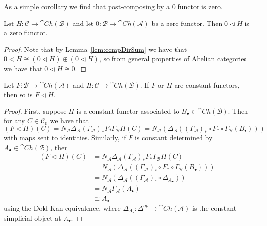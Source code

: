 As a simple corollary we find that post-composing by a $0$ functor is zero.

\begin{cor}[label=cor:contractLHD]
    Let $H:\mathcal{C}\to \cat{Ch}(\mathcal{B})$ and let $0:\mathcal{B}\to \cat{Ch}(\mathcal{A})$ be a zero functor. Then $0\lhd H$ is a zero functor.
\end{cor}
\begin{proof}
    Note that by Lemma~\ref{lem:compDirSum} we have that $0\lhd H \cong (0\lhd H)\oplus (0\lhd H)$, so from general properties of Abelian categories we have that $0\lhd H \cong 0$.
\end{proof}

\begin{lem}[label=lem:constComp]
    Let $F:\mathcal{B}\to \cat{Ch}(\mathcal{A})$ and $H:\mathcal{C}\to \cat{Ch}(\mathcal{B})$. If $F$ or $H$ are constant functors, then so is $F\lhd H$.
\end{lem}
\begin{proof}
    First, suppose $H$ is a constant functor associated to $B_\bullet \in \cat{Ch}(\mathcal{B})$. Then for any $C \in \mathcal{C}_0$ we have that 
    \begin{equation*}
        (F\lhd H)(C) = N_\mathcal{A}\Delta_\mathcal{A}(\Gamma_\mathcal{A})_*F_*\Gamma_\mathcal{B} H(C) = N_\mathcal{A}(\Delta_\mathcal{A}((\Gamma_\mathcal{A})_*\circ F_*\circ \Gamma_\mathcal{B}(B_\bullet))) 
    \end{equation*}
    with maps sent to identities. Similarly, if $F$ is constant determined by $A_\bullet \in \cat{Ch}(\mathcal{B})$, then 
    \begin{align*}
        (F\lhd H)(C) &= N_\mathcal{A}\Delta_\mathcal{A}(\Gamma_\mathcal{A})_*F_*\Gamma_\mathcal{B} H(C) \\
        &= N_\mathcal{A}(\Delta_\mathcal{A}((\Gamma_\mathcal{A})_*\circ F_*\circ \Gamma_\mathcal{B}(B_\bullet)))  \\
        &= N_\mathcal{A}(\Delta_\mathcal{A}((\Gamma_\mathcal{A})_*\circ \Delta_{A_\bullet})) \\
        &= N_\mathcal{A}\Gamma_\mathcal{A}(A_\bullet) \\
        &\cong A_\bullet
    \end{align*}
    using the Dold-Kan equivalence, where $\Delta_{A_\bullet}:\Delta^{op}\to \cat{Ch}(\mathcal{A})$ is the constant simplicial object at $A_\bullet$.
\end{proof}

